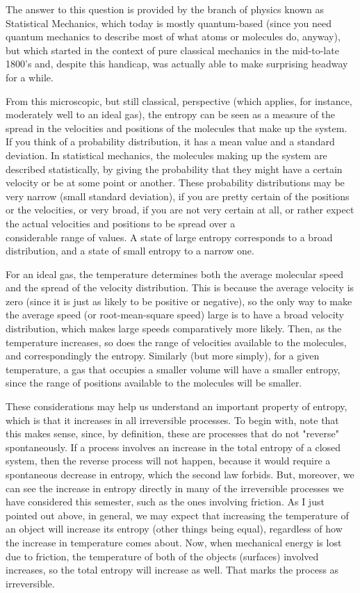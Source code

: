 \documentclass[10pt]{article}
\begin{document}
The answer to this question is provided by the branch of physics known as Statistical Mechanics, which today is mostly quantum-based (since you need quantum mechanics to describe most of what atoms or molecules do, anyway), but which started in the context of pure classical mechanics in the mid-to-late 1800's and, despite this handicap, was actually able to make surprising headway for a while.

From this microscopic, but still classical, perspective (which applies, for instance, moderately well to an ideal gas), the entropy can be seen as a measure of the spread in the velocities and positions of the molecules that make up the system. If you think of a probability distribution, it has a mean value and a standard deviation. In statistical mechanics, the molecules making up the system are described statistically, by giving the probability that they might have a certain velocity or be at some point or another. These probability distributions may be very narrow (small standard deviation), if you are pretty certain of the positions or the velocities, or very broad, if you are not very certain at all, or rather expect the actual velocities and positions to be spread over a\\
considerable range of values. A state of large entropy corresponds to a broad distribution, and a state of small entropy to a narrow one.

For an ideal gas, the temperature determines both the average molecular speed and the spread of the velocity distribution. This is because the average velocity is zero (since it is just as likely to be positive or negative), so the only way to make the average speed (or root-mean-square speed) large is to have a broad velocity distribution, which makes large speeds comparatively more likely. Then, as the temperature increases, so does the range of velocities available to the molecules, and correspondingly the entropy. Similarly (but more simply), for a given temperature, a gas that occupies a smaller volume will have a smaller entropy, since the range of positions available to the molecules will be smaller.

These considerations may help us understand an important property of entropy, which is that it increases in all irreversible processes. To begin with, note that this makes sense, since, by definition, these are processes that do not "reverse" spontaneously. If a process involves an increase in the total entropy of a closed system, then the reverse process will not happen, because it would require a spontaneous decrease in entropy, which the second law forbids. But, moreover, we can see the increase in entropy directly in many of the irreversible processes we have considered this semester, such as the ones involving friction. As I just pointed out above, in general, we may expect that increasing the temperature of an object will increase its entropy (other things being equal), regardless of how the increase in temperature comes about. Now, when mechanical energy is lost due to friction, the temperature of both of the objects (surfaces) involved increases, so the total entropy will increase as well. That marks the process as irreversible.
\end{document}

